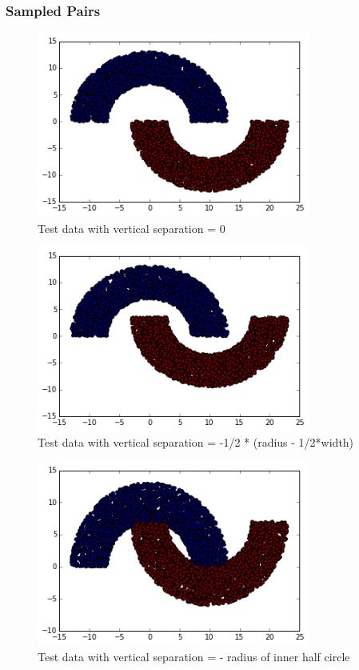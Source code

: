 \documentclass[paper=a4, fontsize=11pt]{scrartcl} %
\numberwithin{equation}{section} %
\numberwithin{figure}{section} %
\numberwithin{table}{section} %
\begin{document}
\subsubsection{Sampled Pairs}
\begin{figure}[H]
	\centering
  \includegraphics[width=0.8\textwidth]{samples_1.png}
	\caption{Test data with vertical separation = 0}
	\label{fig_s1}
\end{figure}
\begin{figure}[H]
	\centering
  \includegraphics[width=0.8\textwidth]{samples_2.png}
	\caption{Test data with vertical separation = -1/2 * (radius - 1/2*width)}
	\label{fig_s2}
\end{figure}
\begin{figure}[H]
	\centering
  \includegraphics[width=0.8\textwidth]{samples_3.png}
	\caption{Test data with vertical separation = - radius of inner half circle}
	\label{fig_s3}
\end{figure}
\end{document}
